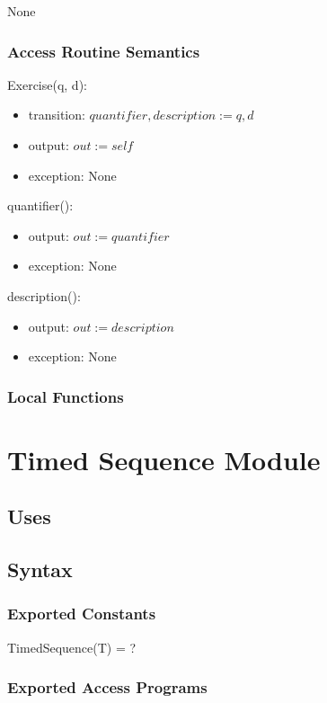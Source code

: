 \documentclass[12pt, titlepage]{article}
\begin{document}
None

\subsubsection{Access Routine Semantics}

\noindent Exercise(q, d):
\begin{itemize}
	\item transition: $quantifier, description := q, d$
	\item output: $out := self$
	\item exception: None
\end{itemize}

\noindent quantifier():
\begin{itemize}
	\item output: $out := quantifier$
	\item exception: None
\end{itemize}

\noindent description():
\begin{itemize}
	\item output: $out := description$
	\item exception: None
\end{itemize}

\subsubsection{Local Functions}

\newpage

\section{Timed Sequence Module}

\subsection{Uses}

\subsection{Syntax}

\subsubsection{Exported Constants}
TimedSequence(T) = ?
\subsubsection{Exported Access Programs}
\end{document}
